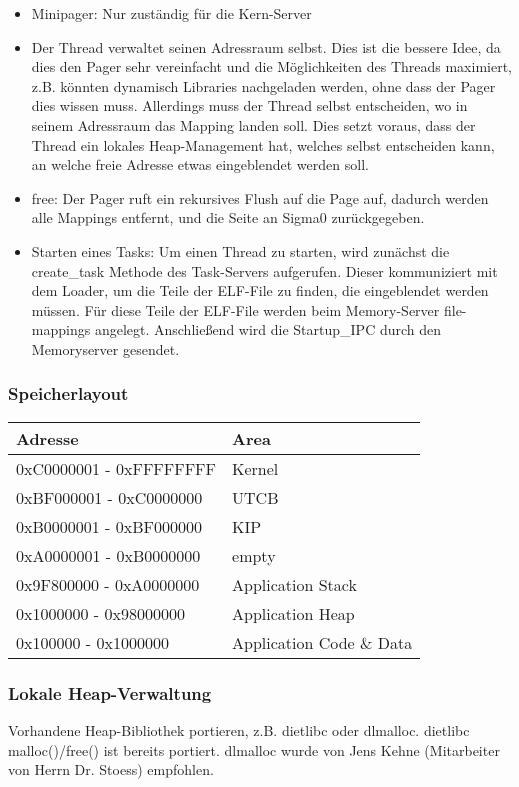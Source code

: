 \begin{itemize}
	\item Minipager: Nur zuständig für die Kern-Server
	
	\item Der Thread verwaltet seinen Adressraum selbst. Dies ist die bessere Idee, da dies den Pager sehr vereinfacht und die Möglichkeiten des Threads maximiert, z.B. könnten dynamisch Libraries nachgeladen werden, ohne dass der Pager dies wissen muss. Allerdings muss  der Thread selbst entscheiden, wo in seinem Adressraum das Mapping landen soll. Dies setzt voraus, dass der Thread ein lokales Heap-Management hat, welches selbst entscheiden kann, an welche freie Adresse etwas eingeblendet werden soll.
	
	\item free: Der Pager ruft ein rekursives Flush auf die Page auf, dadurch werden alle Mappings entfernt, und die Seite an Sigma0 zurückgegeben.
    \item Starten eines Tasks: Um einen Thread zu starten, wird zunächst
        die create\_task Methode des Task-Servers aufgerufen. Dieser
        kommuniziert mit dem Loader, um die Teile der ELF-File zu
        finden, die eingeblendet werden müssen. Für diese Teile der
        ELF-File werden beim Memory-Server file-mappings angelegt.
        Anschließend wird die Startup\_IPC durch den Memoryserver
        gesendet.
\end{itemize}

\subsubsection{Speicherlayout}
\begin{tabular}{|l|l|}
\hline
Adresse & Area \\
\hline
0xC0000001 - 0xFFFFFFFF & Kernel \\
\hline
0xBF000001 - 0xC0000000 & UTCB \\
\hline
0xB0000001 - 0xBF000000 & KIP \\
\hline
0xA0000001 - 0xB0000000 & empty \\
\hline
0x9F800000 - 0xA0000000 & Application Stack \\
\hline
0x1000000 - 0x98000000 & Application Heap \\
\hline
0x100000 - 0x1000000 & Application Code \& Data\\
\hline
\end{tabular}
\subsubsection{Lokale Heap-Verwaltung}

Vorhandene Heap-Bibliothek portieren, z.B. dietlibc oder dlmalloc. dietlibc malloc()/free() ist bereits portiert. dlmalloc wurde von Jens Kehne (Mitarbeiter von Herrn Dr. Stoess) empfohlen.

